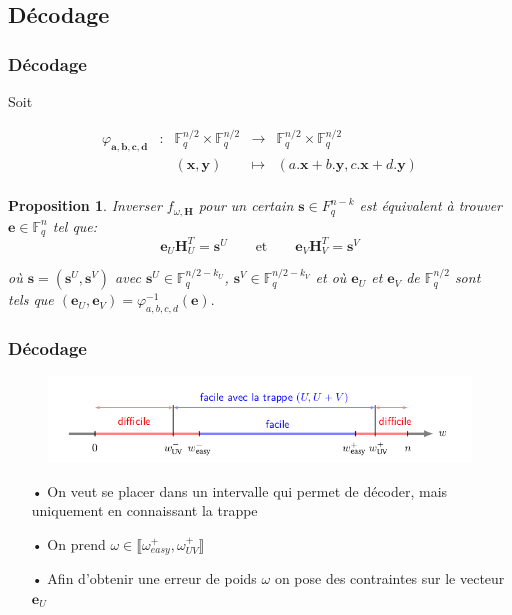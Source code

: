 \documentclass[10pt,a4paper]{beamer}
\theoremstyle{plain}
\newtheorem{propo}[thm]{Proposition}
\theoremstyle{definition}
\newcommand{\F}{\mathbb{F}}
\newcommand{\e}{\mathbf{e}}
\begin{document}
\subsection{Décodage}

\begin{frame}
\frametitle{Décodage}
Soit 

$$\begin{array}{ccccc}
\varphi_{\mathbf{a},\mathbf{b},\mathbf{c},\mathbf{d}} & : & \F_q^{n/2} \times  \F_q^{n/2} & \to & \F_q^{n/2} \times  \F_q^{n/2} \\
 & & (\mathbf{x} , \mathbf{y}) & \mapsto &  (a.\mathbf{x} + b.\mathbf{y}, c.\mathbf{x} + d.\mathbf{y}) \\
\end{array}$$


\begin{propo} Inverser $f_{\omega,\mathbf{H}}$ pour un certain $\mathbf{s} \in F_q^{n-k}$ est équivalent à trouver $\mathbf{e} \in \F_q^n$ tel que:
$$ \mathbf{e}_U\mathbf{H}_U^T = \mathbf{s}^U \qquad \text{et} \qquad \mathbf{e}_V\mathbf{H}_V^T = \mathbf{s}^V $$

\vspace{0.1in}
où $\mathbf{s} = (\mathbf{s}^U, \mathbf{s}^V)$ avec $\mathbf{s}^U \in \F_q^{n/2-k_U}$, $\mathbf{s}^V \in \F_q^{n/2-k_V}$ et où
$\mathbf{e}_U$ et $\mathbf{e}_V$ de $\F_q^{n/2}$ sont\\
\vspace{0.1in}
tels que $(\mathbf{e}_U,\mathbf{e}_V) = \varphi^{-1}_{a,b,c,d}(\mathbf{e}).$
\end{propo}
\end{frame}

\begin{frame}
\frametitle{Décodage}
\begin{figure}
\begin{center}
\includegraphics [scale=0.4]{schema.png}
\end{center}
\end{figure}

\vspace{0.2in}

\begin{itemize}
\item[•] On veut se placer dans un intervalle qui permet de décoder, mais uniquement en connaissant la trappe
\vspace{0.1in}
\item[•] On prend $\omega \in \llbracket \omega_{easy}^+, \omega_{UV}^+\rrbracket$
\vspace{0.1in}
\item[•] Afin d'obtenir une erreur de poids $\omega$ on pose des contraintes sur le vecteur $\e_U$
\end{itemize}

\end{frame}
\end{document}
